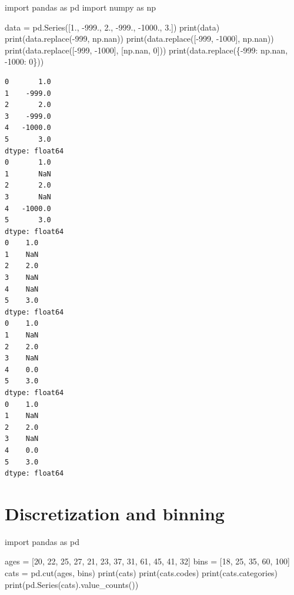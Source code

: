 \documentclass[
  english,
  letterpaper,
  DIV=11,
  numbers=noendperiod]{scrreprt}
\newenvironment{Shaded}{\begin{snugshade}}{\end{snugshade}}
\newcommand{\BuiltInTok}[1]{\textcolor[rgb]{0.00,0.23,0.31}{#1}}
\newcommand{\DecValTok}[1]{\textcolor[rgb]{0.68,0.00,0.00}{#1}}
\newcommand{\FloatTok}[1]{\textcolor[rgb]{0.68,0.00,0.00}{#1}}
\newcommand{\ImportTok}[1]{\textcolor[rgb]{0.00,0.46,0.62}{#1}}
\newcommand{\NormalTok}[1]{\textcolor[rgb]{0.00,0.23,0.31}{#1}}
\newcommand{\OperatorTok}[1]{\textcolor[rgb]{0.37,0.37,0.37}{#1}}
\begin{document}
\begin{Shaded}
\begin{Highlighting}[]
\ImportTok{import}\NormalTok{ pandas }\ImportTok{as}\NormalTok{ pd}
\ImportTok{import}\NormalTok{ numpy }\ImportTok{as}\NormalTok{ np}

\NormalTok{data }\OperatorTok{=}\NormalTok{ pd.Series([}\FloatTok{1.}\NormalTok{, }\OperatorTok{{-}}\FloatTok{999.}\NormalTok{, }\FloatTok{2.}\NormalTok{, }\OperatorTok{{-}}\FloatTok{999.}\NormalTok{, }\OperatorTok{{-}}\FloatTok{1000.}\NormalTok{, }\FloatTok{3.}\NormalTok{])}
\BuiltInTok{print}\NormalTok{(data)}
\BuiltInTok{print}\NormalTok{(data.replace(}\OperatorTok{{-}}\DecValTok{999}\NormalTok{, np.nan))}
\BuiltInTok{print}\NormalTok{(data.replace([}\OperatorTok{{-}}\DecValTok{999}\NormalTok{, }\OperatorTok{{-}}\DecValTok{1000}\NormalTok{], np.nan))}
\BuiltInTok{print}\NormalTok{(data.replace([}\OperatorTok{{-}}\DecValTok{999}\NormalTok{, }\OperatorTok{{-}}\DecValTok{1000}\NormalTok{], [np.nan, }\DecValTok{0}\NormalTok{]))}
\BuiltInTok{print}\NormalTok{(data.replace(\{}\OperatorTok{{-}}\DecValTok{999}\NormalTok{: np.nan, }\OperatorTok{{-}}\DecValTok{1000}\NormalTok{: }\DecValTok{0}\NormalTok{\}))}
\end{Highlighting}
\end{Shaded}

\begin{verbatim}
0       1.0
1    -999.0
2       2.0
3    -999.0
4   -1000.0
5       3.0
dtype: float64
0       1.0
1       NaN
2       2.0
3       NaN
4   -1000.0
5       3.0
dtype: float64
0    1.0
1    NaN
2    2.0
3    NaN
4    NaN
5    3.0
dtype: float64
0    1.0
1    NaN
2    2.0
3    NaN
4    0.0
5    3.0
dtype: float64
0    1.0
1    NaN
2    2.0
3    NaN
4    0.0
5    3.0
dtype: float64
\end{verbatim}

\section{Discretization and binning}\label{discretization-and-binning}

\begin{Shaded}
\begin{Highlighting}[]
\ImportTok{import}\NormalTok{ pandas }\ImportTok{as}\NormalTok{ pd}

\NormalTok{ages }\OperatorTok{=}\NormalTok{ [}\DecValTok{20}\NormalTok{, }\DecValTok{22}\NormalTok{, }\DecValTok{25}\NormalTok{, }\DecValTok{27}\NormalTok{, }\DecValTok{21}\NormalTok{, }\DecValTok{23}\NormalTok{, }\DecValTok{37}\NormalTok{, }\DecValTok{31}\NormalTok{, }\DecValTok{61}\NormalTok{, }\DecValTok{45}\NormalTok{, }\DecValTok{41}\NormalTok{, }\DecValTok{32}\NormalTok{]}
\NormalTok{bins }\OperatorTok{=}\NormalTok{ [}\DecValTok{18}\NormalTok{, }\DecValTok{25}\NormalTok{, }\DecValTok{35}\NormalTok{, }\DecValTok{60}\NormalTok{, }\DecValTok{100}\NormalTok{]}
\NormalTok{cats }\OperatorTok{=}\NormalTok{ pd.cut(ages, bins)}
\BuiltInTok{print}\NormalTok{(cats)}
\BuiltInTok{print}\NormalTok{(cats.codes)}
\BuiltInTok{print}\NormalTok{(cats.categories)}
\BuiltInTok{print}\NormalTok{(pd.Series(cats).value\_counts())}
\end{Highlighting}
\end{Shaded}
\end{document}
